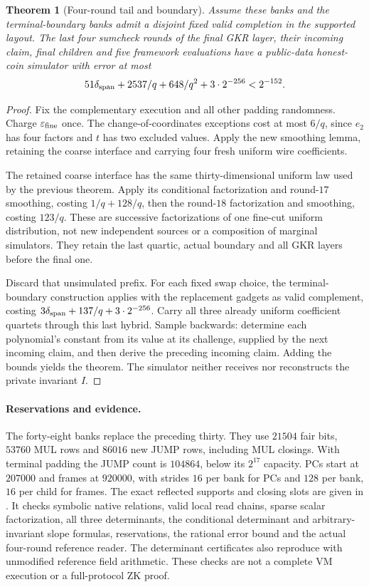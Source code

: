 \documentclass[11pt]{article}
\newtheorem{theorem}[lemma]{Theorem}
\begin{document}
\begin{theorem}[Four-round tail and boundary]
Assume these banks and the terminal-boundary banks admit a disjoint fixed valid completion in the supported layout. The last four sumcheck rounds of the final GKR layer, their incoming claim, final children and five framework evaluations have a public-data honest-coin simulator with error at most
\[
 51\delta_{\rm span}+2537/q+648/q^2+3\cdot2^{-256}<2^{-152}.
\]
\end{theorem}
\begin{proof}
Fix the complementary execution and all other padding randomness. Charge $\varepsilon_{\rm fine}$ once. The change-of-coordinates exceptions cost at most $6/q$, since $e_2$ has four factors and $t$ has two excluded values. Apply the new smoothing lemma, retaining the coarse interface and carrying four fresh uniform wire coefficients.

The retained coarse interface has the same thirty-dimensional uniform law used by the previous theorem. Apply its conditional factorization and round-$17$ smoothing, costing $1/q+128/q$, then the round-$18$ factorization and smoothing, costing $123/q$. These are successive factorizations of one fine-cut uniform distribution, not new independent sources or a composition of marginal simulators. They retain the last quartic, actual boundary and all GKR layers before the final one.

Discard that unsimulated prefix. For each fixed swap choice, the terminal-boundary construction applies with the replacement gadgets as valid complement, costing $3\delta_{\rm span}+137/q+3\cdot2^{-256}$. Carry all three already uniform coefficient quartets through this last hybrid. Sample backwards: determine each polynomial's constant from its value at its challenge, supplied by the next incoming claim, and then derive the preceding incoming claim. Adding the bounds yields the theorem. The simulator neither receives nor reconstructs the private invariant $I$.
\end{proof}

\paragraph{Reservations and evidence.} The forty-eight banks replace the preceding thirty. They use $21504$ fair bits, $53760$ MUL rows and $86016$ new JUMP rows, including MUL closings. With terminal padding the JUMP count is $104864$, below its $2^{17}$ capacity. PCs start at $207000$ and frames at $920000$, with strides $16$ per bank for PCs and $128$ per bank, $16$ per child for frames. The exact reflected supports and closing slots are given in . It checks symbolic native relations, valid local read chains, sparse scalar factorization, all three determinants, the conditional determinant and arbitrary-invariant slope formulas, reservations, the rational error bound and the actual four-round reference reader. The determinant certificates also reproduce with unmodified reference field arithmetic. These checks are not a complete VM execution or a full-protocol ZK proof.
\end{document}
